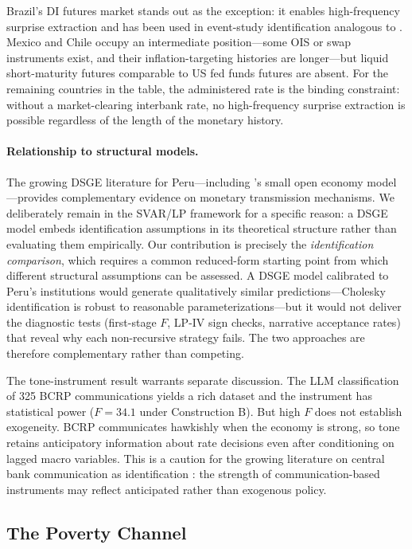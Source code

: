 \documentclass[12pt,letterpaper]{article}
\begin{document}
Brazil's DI futures market stands out as the exception: it enables
high-frequency surprise extraction and has been used in event-study
identification analogous to \citet{gertler2015}. Mexico and Chile occupy
an intermediate position---some OIS or swap instruments exist, and their
inflation-targeting histories are longer---but liquid short-maturity futures
comparable to US fed funds futures are absent. For the remaining countries
in the table, the administered rate is the binding constraint: without a
market-clearing interbank rate, no high-frequency surprise extraction is
possible regardless of the length of the monetary history.

\paragraph{Relationship to structural models.}
The growing DSGE literature for Peru---including \citet{castillo2011}'s
small open economy model---provides complementary evidence on monetary
transmission mechanisms. We deliberately remain in the SVAR/LP framework
for a specific reason: a DSGE model embeds identification assumptions in its
theoretical structure rather than evaluating them empirically. Our
contribution is precisely the \emph{identification comparison}, which
requires a common reduced-form starting point from which different
structural assumptions can be assessed. A DSGE model calibrated to Peru's
institutions would generate qualitatively similar predictions---Cholesky
identification is robust to reasonable parameterizations---but it would not
deliver the diagnostic tests (first-stage $F$, LP-IV sign checks, narrative
acceptance rates) that reveal why each non-recursive strategy fails.
The two approaches are therefore complementary rather than competing.

The tone-instrument result warrants separate discussion. The LLM classification
of 325 BCRP communications yields a rich dataset and the instrument has
statistical power ($F=34.1$ under Construction B). But high $F$ does not
establish exogeneity. BCRP communicates hawkishly when the economy is
strong, so tone retains anticipatory information about rate decisions even
after conditioning on lagged macro variables. This is a caution for the
growing literature on central bank communication as identification
\citep{wolf2020}: the strength of communication-based instruments may
reflect anticipated rather than exogenous policy.

\subsection{The Poverty Channel}
\end{document}
